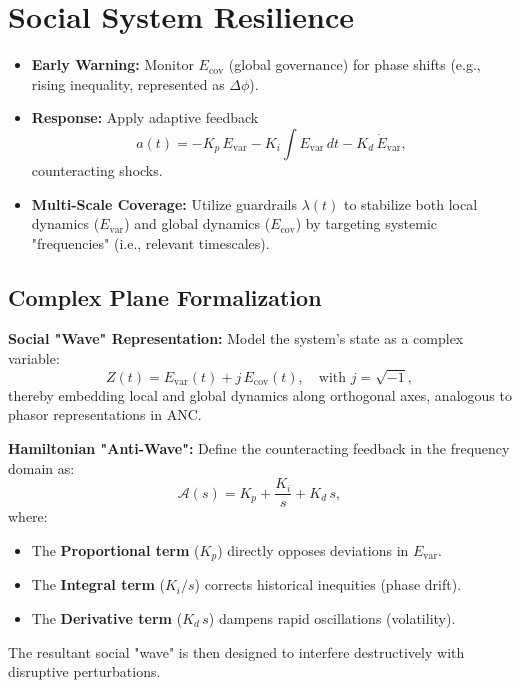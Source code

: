 \documentclass{article}
\theoremstyle{definition}
\begin{document}
\section{Social System Resilience}
\begin{itemize}
    \item \textbf{Early Warning:} Monitor $E_{\text{cov}}$ (global governance) for phase shifts (e.g., rising inequality, represented as $\Delta \phi$).
    \item \textbf{Response:} Apply adaptive feedback 
    \[
    a(t) = -K_p\, E_{\text{var}} - K_i \int E_{\text{var}}\, dt - K_d\, \dot{E}_{\text{var}},
    \]
    counteracting shocks.
    \item \textbf{Multi-Scale Coverage:} Utilize guardrails $\lambda(t)$ to stabilize both local dynamics ($E_{\text{var}}$) and global dynamics ($E_{\text{cov}}$) by targeting systemic "frequencies" (i.e., relevant timescales).
\end{itemize}

\subsection{Complex Plane Formalization}
\textbf{Social "Wave" Representation:} Model the system’s state as a complex variable:
\[
Z(t) = E_{\text{var}}(t) + j\,E_{\text{cov}}(t), \quad \text{with } j = \sqrt{-1},
\]
thereby embedding local and global dynamics along orthogonal axes, analogous to phasor representations in ANC.

\textbf{Hamiltonian "Anti-Wave":} Define the counteracting feedback in the frequency domain as:
\[
\mathcal{A}(s) = K_p + \frac{K_i}{s} + K_d\,s,
\]
where:
\begin{itemize}
    \item The \textbf{Proportional term} ($K_p$) directly opposes deviations in $E_{\text{var}}$.
    \item The \textbf{Integral term} ($K_i/s$) corrects historical inequities (phase drift).
    \item The \textbf{Derivative term} ($K_d\,s$) dampens rapid oscillations (volatility).
\end{itemize}
The resultant social "wave" is then designed to interfere destructively with disruptive perturbations.
\end{document}
